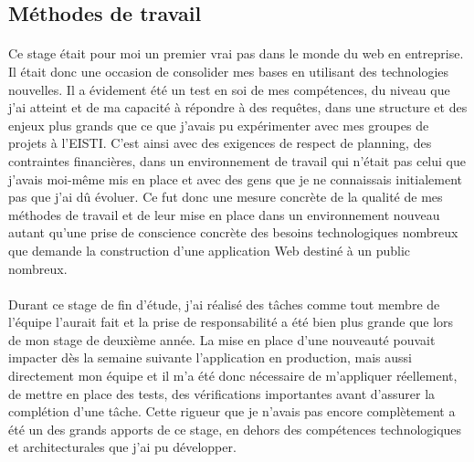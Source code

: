 \subsection{Méthodes de travail}
\label{sub:Méthodes de travail}
\paragraph{}
Ce stage était pour moi un premier vrai pas dans le monde du web en entreprise.
Il était donc une occasion de consolider mes bases en utilisant des technologies nouvelles.
Il a évidement été un test en soi de mes compétences, du niveau que j'ai atteint et de ma capacité à répondre à des requêtes, dans une structure et des enjeux plus grands que ce que j'avais pu expérimenter avec mes groupes de projets à l'EISTI.
C'est ainsi avec des exigences de respect de planning, des contraintes financières, dans un environnement de travail qui n'était pas celui que j'avais moi-même mis en place et avec des gens que je ne connaissais initialement pas que j'ai dû évoluer.
Ce fut donc une mesure concrète de la qualité de mes méthodes de travail et de leur mise en place dans un environnement nouveau autant qu'une prise de conscience concrète des besoins technologiques nombreux que demande la construction d'une application Web destiné à un public nombreux.
\paragraph{}
Durant ce stage de fin d'étude, j'ai réalisé des tâches comme tout membre de l'équipe l'aurait fait et la prise de responsabilité a été bien plus grande que lors de mon stage de deuxième année.
La mise en place d'une nouveauté pouvait impacter dès la semaine suivante l'application en production, mais aussi directement mon équipe et il m'a été donc nécessaire de m'appliquer réellement, de mettre en place des tests, des vérifications importantes avant d'assurer la complétion d'une tâche.
Cette rigueur que je n'avais pas encore complètement a été un des grands apports de ce stage, en dehors des compétences technologiques et architecturales que j'ai pu développer.

